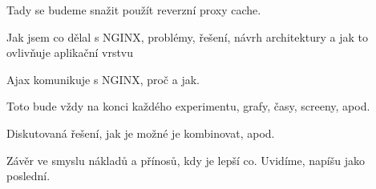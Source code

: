 \documentclass[12pt]{article}
\begin{document}
Tady se budeme snažit použít reverzní proxy cache.

Jak jsem co dělal s NGINX, problémy, řešení, návrh architektury a jak to ovlivňuje aplikační vrstvu

Ajax komunikuje s NGINX, proč a jak.

Toto bude vždy na konci každého experimentu, grafy, časy, screeny, apod.



Diskutovaná řešení, jak je možné je kombinovat, apod.



Závěr ve smyslu nákladů a přínosů, kdy je lepší co. Uvidíme, napíšu jako poslední.
\end{document}
